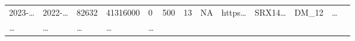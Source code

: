 \documentclass[
]{article}
\begin{document}
\begin{longtable}[]{@{}lllllllllllll@{}}
\begin{minipage}[t]{0.05\columnwidth}
2023-\ldots{}\strut
\end{minipage} & \begin{minipage}[t]{0.05\columnwidth}\raggedright
2022-\ldots{}\strut
\end{minipage} & \begin{minipage}[t]{0.04\columnwidth}\raggedright
82632\strut
\end{minipage} & \begin{minipage}[t]{0.05\columnwidth}\raggedright
41316000\strut
\end{minipage} & \begin{minipage}[t]{0.05\columnwidth}\raggedright
0\strut
\end{minipage} & \begin{minipage}[t]{0.05\columnwidth}\raggedright
500\strut
\end{minipage} & \begin{minipage}[t]{0.05\columnwidth}\raggedright
13\strut
\end{minipage} & \begin{minipage}[t]{0.05\columnwidth}\raggedright
NA\strut
\end{minipage} & \begin{minipage}[t]{0.05\columnwidth}\raggedright
https\ldots{}\strut
\end{minipage} & \begin{minipage}[t]{0.05\columnwidth}\raggedright
SRX14\ldots{}\strut
\end{minipage} & \begin{minipage}[t]{0.08\columnwidth}\raggedright
DM\_12\strut
\end{minipage} & \begin{minipage}[t]{0.02\columnwidth}\raggedright
\ldots{}\strut
\end{minipage}\tabularnewline
\begin{minipage}[t]{0.05\columnwidth}\raggedright
\ldots{}\strut
\end{minipage} & \begin{minipage}[t]{0.05\columnwidth}\raggedright
\ldots{}\strut
\end{minipage} & \begin{minipage}[t]{0.05\columnwidth}\raggedright
\ldots{}\strut
\end{minipage} & \begin{minipage}[t]{0.04\columnwidth}\raggedright
\ldots{}\strut
\end{minipage} & \begin{minipage}[t]{0.05\columnwidth}\raggedright
\ldots{}\strut

\end{minipage}
\end{longtable}
\end{document}
